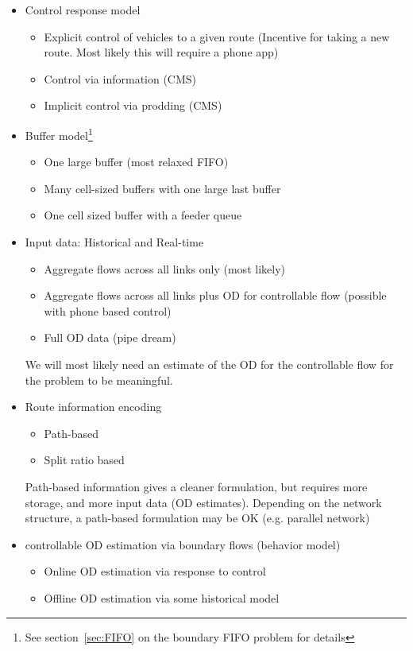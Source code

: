 \documentclass[10pt,a4paper]{article}
\begin{document}
\begin{itemize}
\item Control response model
	\begin{itemize}
	\item Explicit control of vehicles to a given route (Incentive for taking a new route. Most likely this will require a phone app)
	\item Control via information (CMS)
	\item Implicit control via prodding (CMS)
	\end{itemize}	
	
\item Buffer model\footnote{See section~\ref{sec:FIFO} on the boundary FIFO problem for details}
	\begin{itemize}
	\item One large buffer (most relaxed FIFO)
	\item Many cell-sized buffers with one large last buffer
	\item One cell sized buffer with a feeder queue
	\end{itemize}
\item Input data: Historical and Real-time
	\begin{itemize}
	\item Aggregate flows across all links only (most likely)
	\item Aggregate flows across all links plus OD for controllable flow (possible with phone based control)
	\item Full OD data (pipe dream)
	\end{itemize}	
	We will most likely need an estimate of the OD for the controllable flow for the problem to be meaningful.
\item Route information encoding
	\begin{itemize}
	\item Path-based
	\item Split ratio based
	\end{itemize}
	Path-based information gives a cleaner formulation, but requires more storage, and more input data (OD estimates). Depending on the network structure, a path-based formulation may be OK (e.g. parallel network)
\item controllable OD estimation via boundary flows (behavior model)
	\begin{itemize}
	\item Online OD estimation via response to control
	\item Offline OD estimation via some historical model
	\end{itemize}	

\end{itemize}
\end{document}

